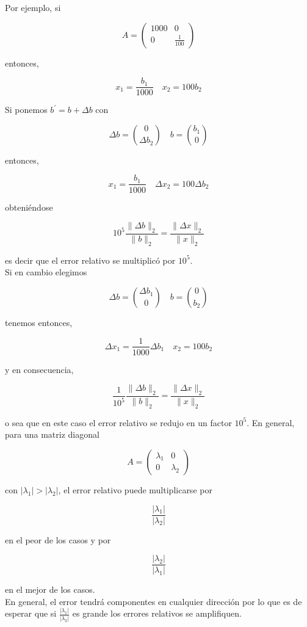 \documentclass[10pt]{book}
\begin{document}
Por ejemplo, si

$$
A=\left(\begin{array}{cc}
1000 & 0 \\
0 & \frac{1}{100}
\end{array}\right)
$$

entonces,

$$
x_{1}=\frac{b_{1}}{1000} \quad x_{2}=100 b_{2}
$$

Si ponemos $b^{\prime}=b+\Delta b$ con

$$
\Delta b=\binom{0}{\Delta b_{2}} \quad b=\binom{b_{1}}{0}
$$

entonces,

$$
x_{1}=\frac{b_{1}}{1000} \quad \Delta x_{2}=100 \Delta b_{2}
$$

obteniéndose

$$
10^{5} \frac{\|\Delta b\|_{2}}{\|b\|_{2}}=\frac{\|\Delta x\|_{2}}{\|x\|_{2}}
$$

es decir que el error relativo se multiplicó por $10^{5}$.\\
Si en cambio elegimos

$$
\Delta b=\binom{\Delta b_{1}}{0} \quad b=\binom{0}{b_{2}}
$$

tenemos entonces,

$$
\Delta x_{1}=\frac{1}{1000} \Delta b_{1} \quad x_{2}=100 b_{2}
$$

y en consecuencia,

$$
\frac{1}{10^{5}} \frac{\|\Delta b\|_{2}}{\|b\|_{2}}=\frac{\|\Delta x\|_{2}}{\|x\|_{2}}
$$

o sea que en este caso el error relativo se redujo en un factor $10^{5}$. En general, para una matriz diagonal

$$
A=\left(\begin{array}{cc}
\lambda_{1} & 0 \\
0 & \lambda_{2}
\end{array}\right)
$$

con $\left|\lambda_{1}\right|>\left|\lambda_{2}\right|$, el error relativo puede multiplicarse por

$$
\frac{\left|\lambda_{1}\right|}{\left|\lambda_{2}\right|}
$$

en el peor de los casos y por

$$
\frac{\left|\lambda_{2}\right|}{\left|\lambda_{1}\right|}
$$

en el mejor de los casos.\\
En general, el error tendrá componentes en cualquier dirección por lo que es de esperar que si $\frac{\left|\lambda_{1}\right|}{\left|\lambda_{2}\right|}$ es grande los errores relativos se amplifiquen.
\end{document}
